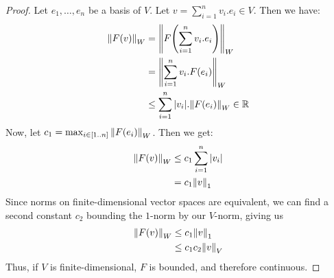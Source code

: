 \begin{proof}
	Let $e_1, \hdots, e_n$ be a basis of $V$. Let $v = \sum_{i = 1}^n v_i.e_i \in V$. Then we have:
	\begin{align*}
		\norm{F(v)}_W &= \norm{F\qty(\sum_{i = 1}^n v_i.e_i)}_W\\
		&= \norm{\sum_{i = 1}^n v_i.F\qty(e_i)}_W\\
		&\leq \sum_{i = 1}^n  \abs{v_i}.\norm{F\qty(e_i)}_W \in \mathbb{R}
	\end{align*}	
	Now, let $c_1 = \max_{i \in [1..n]} \norm{F\qty(e_i)}_W$. Then we get:
	\begin{align*}
		\norm{F(v)}_W 
		&\leq c_1 \sum_{i = 1}^n \abs{v_i}\\
		&= c_1 \norm{v}_1
	\end{align*}
	Since norms on finite-dimensional vector spaces are equivalent, we can find a second constant $c_2$ bounding the $1$-norm by our $V$-norm, giving us
	\begin{align*}
		\norm{F(v)}_W 
		&\leq c_1 \norm{v}_1\\
		&\leq c_1c_2 \norm{v}_V
	\end{align*}
	Thus, if $V$ is finite-dimensional, $F$ is bounded, and therefore continuous.
\end{proof}
